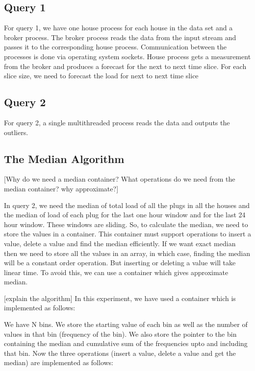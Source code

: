 \subsection{Query 1}
For query 1, we have one house process for each house in the data set and a broker process. The broker process reads the data from the input stream and passes it to the corresponding house process. Communication between the processes is done via operating system sockets. House process gets a measurement from the broker and produces a forecast for the next to next time slice. 
For each slice size, we need to forecast the load for next to next time slice 
\subsection{Query 2}
For query 2, a single multithreaded process reads the data and outputs the outliers. 
\subsection{The Median Algorithm}
[Why do we need a median container?
What operations do we need from the median container?
why approximate?]

In query 2, we need the median of total load of all the plugs in all the houses and the median of load of each plug for the last one hour window and for the last 24 hour window. These windows are sliding. So, to calculate the median, we need to store the values in a container. This container must support operations to insert a value, delete a value and find the median efficiently. If we want exact median then we need to store all the values in an array, in which case, finding the median will be a constant order operation. But inserting or deleting a value will take linear time. To avoid this, we can use a container which gives approximate median.


[explain the algorithm]
In this experiment, we have used a container which is implemented as follows:

We have N bins. We store the starting value of each bin as well as the number of values in that bin (frequency of the bin). We also store the pointer to the bin containing the median and cumulative sum of the frequencies upto and including that bin. Now the three operations (insert a value, delete a value and get the median) are implemented as follows:



